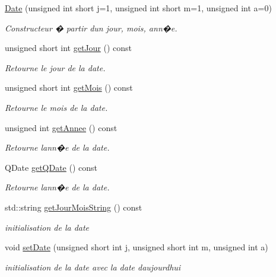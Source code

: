 \begin{DoxyCompactItemize}
\item 
\hyperlink{class_t_i_m_e_1_1_date_ab0d72ce6e986c0c0a5f2902e586cf81a}{Date} (unsigned int short j=1, unsigned int short m=1, unsigned int a=0)
\begin{DoxyCompactList}\small\item\em Constructeur � partir d\textquotesingle{}un jour, mois, ann�e. \end{DoxyCompactList}\item 
unsigned short int \hyperlink{class_t_i_m_e_1_1_date_a4af978b7df2b738f62449b0a7e53c21d}{get\+Jour} () const 
\begin{DoxyCompactList}\small\item\em Retourne le jour de la date. \end{DoxyCompactList}\item 
unsigned short int \hyperlink{class_t_i_m_e_1_1_date_a6cb9d945143df216115419c4cb8b14ce}{get\+Mois} () const 
\begin{DoxyCompactList}\small\item\em Retourne le mois de la date. \end{DoxyCompactList}\item 
unsigned int \hyperlink{class_t_i_m_e_1_1_date_a07b41b2e9e85ef78bf13689e772bef7d}{get\+Annee} () const 
\begin{DoxyCompactList}\small\item\em Retourne l\textquotesingle{}ann�e de la date. \end{DoxyCompactList}\item 
Q\+Date \hyperlink{class_t_i_m_e_1_1_date_a30428bf3b5e4daa144642dfa510edb14}{get\+Q\+Date} () const 
\begin{DoxyCompactList}\small\item\em Retourne l\textquotesingle{}ann�e de la date. \end{DoxyCompactList}\item 
std\+::string \hyperlink{class_t_i_m_e_1_1_date_a09b00b96742bfceaa598060b486e604c}{get\+Jour\+Mois\+String} () const 
\begin{DoxyCompactList}\small\item\em initialisation de la date \end{DoxyCompactList}\item 
void \hyperlink{class_t_i_m_e_1_1_date_a7419902750e61b9473ab05ccd5ced33d}{set\+Date} (unsigned short int j, unsigned short int m, unsigned int a)
\begin{DoxyCompactList}\small\item\em initialisation de la date avec la date d\textquotesingle{}aujourd\textquotesingle{}hui \end{DoxyCompactList}\item 

\end{DoxyCompactItemize}
